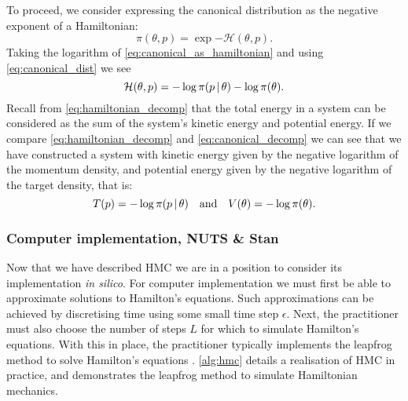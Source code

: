 To proceed, we consider expressing the canonical distribution as the
negative exponent of a Hamiltonian:
\begin{equation}
  \label{eq:canonical_as_hamiltonian}
  \pi(\theta, p) = \exp{-\mathcal{H}(\theta, p)}.
\end{equation}
Taking the logarithm of \cref{eq:canonical_as_hamiltonian} and using \cref{eq:canonical_dist}
we see
\begin{equation}
  \label{eq:canonical_decomp}
  \mathcal{H}(\theta, p) = -\log{\pi(p \,|\,\theta)} - \log{\pi(\theta)}.
\end{equation}
Recall from \cref{eq:hamiltonian_decomp} that the total energy in a system can be
considered as the sum of the system's kinetic energy and potential energy.  If we compare
\cref{eq:hamiltonian_decomp} and \cref{eq:canonical_decomp} we can see that we have
constructed a system with kinetic energy given by the negative logarithm of the momentum
density, and potential energy given by the negative logarithm of the target density, that
is:
\begin{equation*}
    T(p) = -\log{\pi(p \,|\,\theta)} \quad\text{and}\quad V(\theta) = -\log{\pi(\theta)}.
\end{equation*}

\subsubsection{Computer implementation, NUTS \& Stan}

Now that we have described HMC we are in a position to consider its implementation
\emph{in silico}. For computer implementation we must first be able to approximate
solutions to Hamilton's equations. Such approximations can be achieved by discretising
time using some small time step $\epsilon$. Next, the practitioner must also choose the
number of steps $L$ for which to simulate Hamilton's equations. With this in place, the
practitioner typically implements the leapfrog method to solve Hamilton's equations
\parencite{neal11}. \cref{alg:hmc} details a realisation of HMC in practice, and
demonstrates the leapfrog method to simulate Hamiltonian mechanics.

